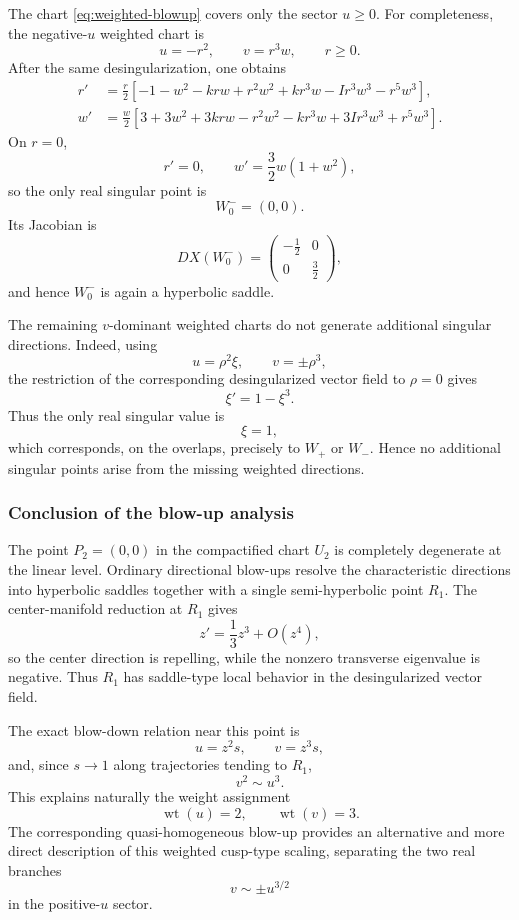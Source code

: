 \documentclass[11pt,reqno]{amsart}
\theoremstyle{plain}
\theoremstyle{definition}
\theoremstyle{remark}
\begin{document}
The chart \eqref{eq:weighted-blowup} covers only the sector $u\geq0$.
For completeness, the negative-$u$ weighted chart is
\[
u=-r^2,
\qquad
v=r^3w,
\qquad r\geq0.
\]
After the same desingularization, one obtains
\begin{equation}
\label{eq:weighted-negative-u}
\begin{aligned}
r'
&=
\frac r2
\left[
-1-w^2
-krw
+r^2w^2
+kr^3w
-Ir^3w^3
-r^5w^3
\right],
\\
w'
&=
\frac w2
\left[
3+3w^2
+3krw
-r^2w^2
-kr^3w
+3Ir^3w^3
+r^5w^3
\right].
\end{aligned}
\end{equation}
On $r=0$,
\[
r'=0,
\qquad
w'=\frac32w(1+w^2),
\]
so the only real singular point is
\[
W_0^-=(0,0).
\]
Its Jacobian is
\[
D X(W_0^-)
=
\begin{pmatrix}
-\frac12&0\\
0&\frac32
\end{pmatrix},
\]
and hence $W_0^-$ is again a hyperbolic saddle.

The remaining $v$-dominant weighted charts do not generate additional
singular directions. Indeed, using
\[
u=\rho^2\xi,
\qquad
v=\pm\rho^3,
\]
the restriction of the corresponding desingularized vector field to
$\rho=0$ gives
\[
\xi'=1-\xi^3.
\]
Thus the only real singular value is
\[
\xi=1,
\]
which corresponds, on the overlaps, precisely to $W_+$ or $W_-$.
Hence no additional singular points arise from the missing weighted
directions.

\subsubsection{Conclusion of the blow-up analysis}
\label{subsubsec:blowup-conclusion}

The point $P_2=(0,0)$ in the compactified chart $U_2$ is completely
degenerate at the linear level. Ordinary directional blow-ups resolve
the characteristic directions into hyperbolic saddles together with
a single semi-hyperbolic point $R_1$. The center-manifold reduction at
$R_1$ gives
\[
z'
=
\frac13z^3
+
O(z^4),
\]
so the center direction is repelling, while the nonzero transverse
eigenvalue is negative. Thus $R_1$ has saddle-type local behavior in
the desingularized vector field.

The exact blow-down relation near this point is
\[
u=z^2s,
\qquad
v=z^3s,
\]
and, since $s\to1$ along trajectories tending to $R_1$,
\[
v^2\sim u^3.
\]
This explains naturally the weight assignment
\[
\operatorname{wt}(u)=2,
\qquad
\operatorname{wt}(v)=3.
\]
The corresponding quasi-homogeneous blow-up provides an alternative
and more direct description of this weighted cusp-type scaling,
separating the two real branches
\[
v\sim\pm u^{3/2}
\]
in the positive-$u$ sector.
\end{document}
